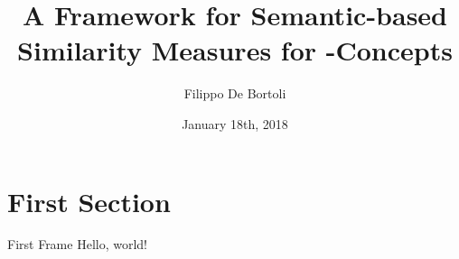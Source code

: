 \documentclass{beamer}
\title{A Framework for Semantic-based Similarity Measures for \elh-Concepts}
\author{Filippo De Bortoli}
\institute{European Master's Programme in Computational Logic, TU Dresden}
\date{January 18th, 2018}
\begin{document}
\maketitle
\section{First Section}
\begin{frame}{First Frame}
Hello, world!
\end{frame}
\end{document}
